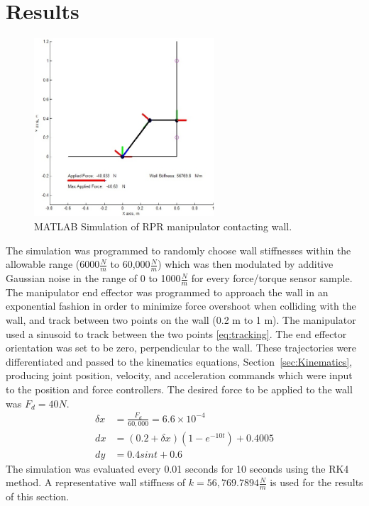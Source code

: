 \documentclass[letterpaper,12pt]{report}
\begin{document}
\chapter{Results}
\begin{figure}[ht]
\centering
\includegraphics[width=0.6\textwidth]{SimulationImage}
\caption{MATLAB Simulation of RPR manipulator contacting wall.}
\label{fig:SimImage}
\end{figure}
The simulation was programmed to randomly choose wall stiffnesses within the allowable range (6000$\frac Nm$ to 60,000$\frac Nm$) which was then 
modulated by additive Gaussian noise in the range of 0 to 1000$\frac Nm$ for every force/torque sensor sample. The manipulator end effector was 
programmed to approach the wall in an exponential fashion in order to minimize force overshoot when colliding with the wall, and track between 
two points on the wall (0.2 m to 1 m). The manipulator used a sinusoid to track between the two points \eqref{eq:tracking}. The end effector orientation
was set to be zero, perpendicular to the wall. These trajectories were differentiated and passed to the kinematics equations, 
Section~\ref{sec:Kinematics}, producing joint position, velocity, and acceleration commands which were input to the position and force controllers.
The desired force to be applied to the wall was $F_d = 40 N$.
\begin{subequations} \label{eq:tracking}
\begin{align}
	\delta x &= \frac {F_d}{60,000} = 6.6\times10^{-4}\\
	dx &= (0.2 + \delta x)(1 - e^{-10t}) + 0.4005\\
	dy &= 0.4sint + 0.6
\end{align}
\end{subequations}
The simulation was evaluated every 0.01 seconds for 10 seconds using the RK4 method. A representative wall stiffness of $k = 56,769.7894 \frac Nm$
is used for the results of this section.
\end{document}
